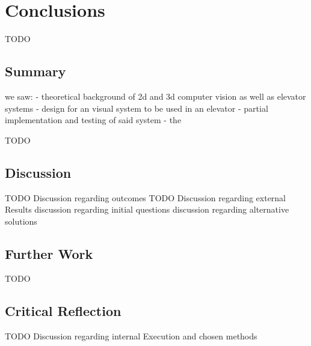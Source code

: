 \chapter{Conclusions}
\label{chap:concl}

TODO

\section{Summary}

we saw:
- theoretical background of 2d and 3d computer vision as well as elevator systems
- design for an visual system to be used in an elevator
- partial implementation and testing of said system
- the 



TODO

\section{Discussion}

TODO Discussion regarding outcomes
TODO Discussion regarding external Results
discussion regarding initial questions
discussion regarding alternative solutions

\section{Further Work}

TODO

\section{Critical Reflection}

TODO  Discussion regarding internal Execution and chosen methods
